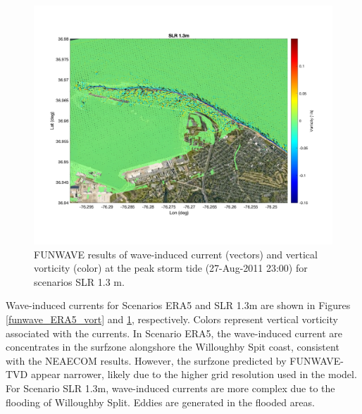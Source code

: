 \documentclass[11pt]{article}
\begin{document}
\begin{figure}[h!]
\centering
\includegraphics[width=\textwidth]{./figures/funwave_SLR_vort.jpg}
\caption{FUNWAVE results of wave-induced current (vectors) and vertical vorticity (color) at the peak storm tide (27-Aug-2011 23:00) for scenarios SLR 1.3 m.}
\label{funwave_SLR_vort}
\centering
\end{figure}

Wave-induced currents for Scenarios ERA5 and SLR 1.3m are shown in Figures \ref{funwave_ERA5_vort} and \ref{funwave_SLR_vort}, respectively. Colors represent vertical vorticity associated with the currents. In Scenario ERA5, the wave-induced current are concentrates in the surfzone alongshore the Willoughby Spit coast, consistent with the NEAECOM results. However, the surfzone predicted by FUNWAVE-TVD appear  narrower, likely due to the higher grid resolution used in the model. For Scenario SLR 1.3m, wave-induced currents are more complex due to the flooding of Willoughby Split. Eddies are generated in the flooded areas. 
\end{document}
